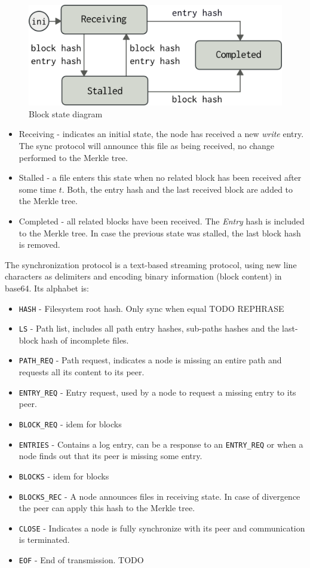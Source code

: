 \documentclass{sig-alternate}
\begin{document}
\begin{figure}[htp]
\centering
\includegraphics[width=\columnwidth]{imgs/blockstate.png}
\caption{Block state diagram}
\label{fig:lion}
\end{figure}


\begin{itemize}
\item Receiving - indicates an initial state, the node has received a new \textit{write} entry. The sync protocol will announce this file as being received, no change performed to the Merkle tree.
\item Stalled - a file enters this state when no related block has been received after some time $t$. Both, the entry hash and the last received block are added to the Merkle tree.
\item Completed - all related blocks have been received. The \textit{Entry} hash is included to the Merkle tree. In case the previous state was stalled, the last block hash is removed.
\end{itemize}


The synchronization protocol is a text-based streaming protocol, using new line characters as delimiters and encoding binary information (block content) in base64. Its alphabet is:

\begin{itemize}
\item \texttt{HASH} - Filesystem root hash. Only sync when equal TODO REPHRASE
\item \texttt{LS} - Path list, includes all path entry hashes, sub-paths hashes and the last-block hash of incomplete files.
\item \texttt{PATH\_REQ} - Path request, indicates a node is missing an entire path and requests all its content to its peer.
\item \texttt{ENTRY\_REQ} - Entry request, used by a node to request a missing entry to its peer.
\item \texttt{BLOCK\_REQ} - idem for blocks
\item \texttt{ENTRIES} - Contains a log entry, can be a response to an \texttt{ENTRY\_REQ} or when a node finds out that its peer is missing some entry.
\item \texttt{BLOCKS} - idem for blocks
\item \texttt{BLOCKS\_REC} - A node announces files in receiving state. In case of divergence the peer can apply this hash to the Merkle tree.
\item \texttt{CLOSE} - Indicates a node is fully synchronize with its peer and communication is terminated.
\item \texttt{EOF} - End of transmission. TODO
\end{itemize}
\end{document}
